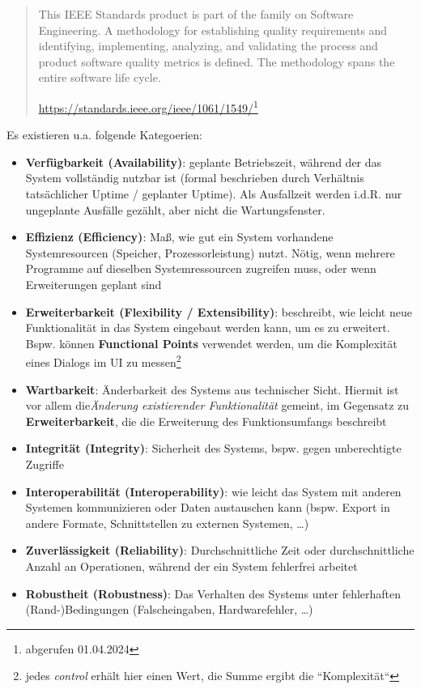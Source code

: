 \blockquote[{\url{https://standards.ieee.org/ieee/1061/1549/}\footnote{abgerufen 01.04.2024}}]{
    This IEEE Standards product is part of the family on Software Engineering. A methodology for establishing quality requirements and identifying, implementing, analyzing, and validating the process and product software quality metrics is defined. The methodology spans the entire software life cycle.
}

\noindent
Es existieren u.a. folgende Kategoerien:

\begin{itemize}
    \item \textbf{Verfügbarkeit (Availability)}: geplante Betriebszeit, während der das System vollständig nutzbar ist (formal beschrieben durch Verhältnis tatsächlicher Uptime / geplanter Uptime).
    Als Ausfallzeit werden i.d.R. nur ungeplante Ausfälle gezählt, aber nicht die Wartungsfenster.
    \item \textbf{Effizienz (Efficiency)}: Maß, wie gut ein System vorhandene Systemresourcen (Speicher, Prozessorleistung) nutzt.
    Nötig, wenn mehrere Programme auf dieselben Systemressourcen zugreifen muss, oder wenn Erweiterungen geplant sind
    \item \textbf{Erweiterbarkeit (Flexibility / Extensibility)}: beschreibt, wie leicht neue Funktionalität in das System eingebaut werden kann, um es zu erweitert.
    Bspw. können \textbf{Functional Points} verwendet werden, um die Komplexität eines Dialogs im UI zu messen\footnote{jedes \textit{control} erhält hier einen Wert, die Summe ergibt die ``Komplexität``}
    \item \textbf{Wartbarkeit}: Änderbarkeit des Systems aus technischer Sicht.
    Hiermit ist vor allem die\textit{Änderung existierender Funktionalität} gemeint, im Gegensatz zu \textbf{Erweiterbarkeit}, die die Erweiterung des Funktionsumfangs beschreibt
    \item \textbf{Integrität (Integrity)}: Sicherheit des Systems, bspw. gegen unberechtigte Zugriffe
    \item \textbf{Interoperabilität (Interoperability)}: wie leicht das System mit anderen Systemen kommunizieren oder Daten austauschen kann (bspw. Export in andere Formate, Schnittstellen zu externen Systemen, \ldots)
    \item \textbf{Zuverlässigkeit (Reliability)}: Durchschnittliche Zeit oder durchschnittliche Anzahl an Operationen, während der ein System fehlerfrei arbeitet
    \item \textbf{Robustheit (Robustness)}: Das Verhalten des Systems unter fehlerhaften (Rand-)Bedingungen (Falscheingaben, Hardwarefehler, \ldots)

\end{itemize}
